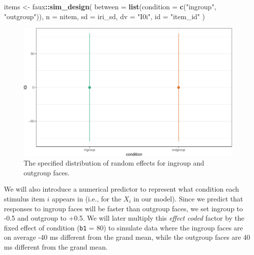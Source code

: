 \documentclass[man,floatsintext]{apa6}
\newenvironment{Shaded}{\begin{snugshade}}{\end{snugshade}}
\newcommand{\KeywordTok}[1]{\textcolor[rgb]{0.13,0.29,0.53}{\textbf{#1}}}
\newcommand{\DataTypeTok}[1]{\textcolor[rgb]{0.13,0.29,0.53}{#1}}
\newcommand{\FloatTok}[1]{\textcolor[rgb]{0.00,0.00,0.81}{#1}}
\newcommand{\StringTok}[1]{\textcolor[rgb]{0.31,0.60,0.02}{#1}}
\newcommand{\CommentTok}[1]{\textcolor[rgb]{0.56,0.35,0.01}{\textit{#1}}}
\newcommand{\OperatorTok}[1]{\textcolor[rgb]{0.81,0.36,0.00}{\textbf{#1}}}
\newcommand{\NormalTok}[1]{#1}
\begin{document}
\begin{Shaded}
\begin{Highlighting}[]
\NormalTok{items <-}\StringTok{ }\NormalTok{faux}\OperatorTok{::}\KeywordTok{sim_design}\NormalTok{(}
  \DataTypeTok{between =} \KeywordTok{list}\NormalTok{(}\DataTypeTok{condition =} \KeywordTok{c}\NormalTok{(}\StringTok{"ingroup"}\NormalTok{, }\StringTok{"outgroup"}\NormalTok{)),}
  \DataTypeTok{n =}\NormalTok{ nitem,}
  \DataTypeTok{sd =}\NormalTok{ iri_sd,}
  \DataTypeTok{dv =} \StringTok{"I0i"}\NormalTok{,}
  \DataTypeTok{id =} \StringTok{"item_id"}
\NormalTok{)}
\end{Highlighting}
\end{Shaded}

\begin{figure}

{\centering \includegraphics[width=0.75\linewidth]{images/sim-items-1} 

}

\caption{The specified distribution of random effects for ingroup and outgroup faces.}\label{fig:sim-items}
\end{figure}

We will also introduce a numerical predictor to represent what condition
each stimulus item \(i\) appears in (i.e., for the \(X_i\) in our
model). Since we predict that responses to ingroup faces will be faster
than outgroup faces, we set ingroup to -0.5 and outgroup to +0.5. We
will later multiply this \emph{effect coded} factor by the fixed effect
of condition (\texttt{b1} = 80) to simulate data where the ingroup faces
are on average -40 ms different from the grand mean, while the outgroup
faces are 40 ms different from the grand mean.

\begin{Shaded}
\end{Shaded}
\end{document}
